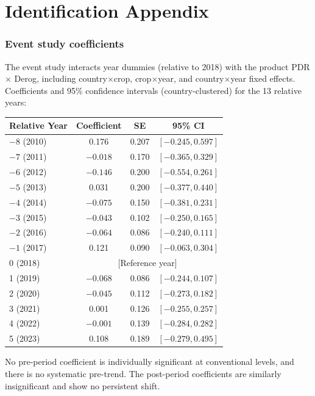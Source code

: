 \documentclass[12pt]{article}
\begin{document}
\section{Identification Appendix}

\subsubsection*{Event study coefficients} The event study interacts year dummies (relative to 2018) with the product PDR $\times$ Derog, including country$\times$crop, crop$\times$year, and country$\times$year fixed effects. Coefficients and 95\% confidence intervals (country-clustered) for the 13 relative years:

\begin{center}
\begin{small}
\begin{tabular}{lccc}
\toprule
Relative Year & Coefficient & SE & 95\% CI \\
\midrule
$-8$ (2010) & 0.176 & 0.207 & $[-0.245, 0.597]$ \\
$-7$ (2011) & $-0.018$ & 0.170 & $[-0.365, 0.329]$ \\
$-6$ (2012) & $-0.146$ & 0.200 & $[-0.554, 0.261]$ \\
$-5$ (2013) & 0.031 & 0.200 & $[-0.377, 0.440]$ \\
$-4$ (2014) & $-0.075$ & 0.150 & $[-0.381, 0.231]$ \\
$-3$ (2015) & $-0.043$ & 0.102 & $[-0.250, 0.165]$ \\
$-2$ (2016) & $-0.064$ & 0.086 & $[-0.240, 0.111]$ \\
$-1$ (2017) & 0.121 & 0.090 & $[-0.063, 0.304]$ \\
0 (2018) & \multicolumn{3}{c}{[Reference year]} \\
1 (2019) & $-0.068$ & 0.086 & $[-0.244, 0.107]$ \\
2 (2020) & $-0.045$ & 0.112 & $[-0.273, 0.182]$ \\
3 (2021) & 0.001 & 0.126 & $[-0.255, 0.257]$ \\
4 (2022) & $-0.001$ & 0.139 & $[-0.284, 0.282]$ \\
5 (2023) & 0.108 & 0.189 & $[-0.279, 0.495]$ \\
\bottomrule
\end{tabular}
\end{small}
\end{center}

No pre-period coefficient is individually significant at conventional levels, and there is no systematic pre-trend. The post-period coefficients are similarly insignificant and show no persistent shift.
\end{document}
